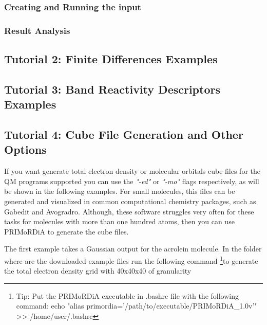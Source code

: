 \documentclass[a4paper,11pt]{refart}
\begin{document}
\hspace*{-\leftmarginwidth}
\begin{minipage}{\fullwidth}
	\begin{commandshell}\end{commandshell}
\end{minipage}

\subsubsection{Creating and Running the input}


\subsubsection{Result Analysis}


\subsection{Tutorial 2: Finite Differences Examples }


\subsection{Tutorial 3: Band Reactivity Descriptors Examples }


\subsection{Tutorial 4: Cube File Generation and Other Options }

If you want generate total electron density or molecular orbitals cube files for the QM programs supported you can use the \emph{"-ed"} or \emph{"-mo"} flags respectively, as will be shown in the following examples. For small molecules, this files can be generated and visualized in common computational chemistry packages, such as Gabedit and Avogradro. Although, these software struggles very often for these tasks for molecules with more than one hundred atoms, then you can use PRIMoRDiA to generate the cube files. 

The first example takes a Gaussian output for the acrolein molecule. In the folder where are the downloaded example files run the following command \footnote{Tip: Put the PRIMoRDiA executable in .bashrc file with the following command: echo "alias primordia='/path/to/executable/PRIMoRDiA\_1.0v'" >> /home/user/.bashrc }to generate the total electron density grid with 40x40x40 of granularity 
\end{document}

